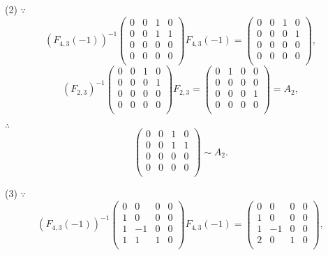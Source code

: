 \documentclass[color=black,device=normal,lang=cn,mode=geye]{elegantnote}
\begin{document}
\begin{solution}
    (2) $\because$
    \[(F_{4,3}(-1))^{-1}\begin{pmatrix}
        0 & 0 & 1 & 0 \\
        0 & 0 & 1 & 1 \\
        0 & 0 & 0 & 0 \\
        0 & 0 & 0 & 0 \\
    \end{pmatrix}F_{4,3}(-1)=\begin{pmatrix}
        0 & 0 & 1 & 0 \\
        0 & 0 & 0 & 1 \\
        0 & 0 & 0 & 0 \\
        0 & 0 & 0 & 0 \\
    \end{pmatrix},\]
    \[(F_{2,3})^{-1}\begin{pmatrix}
        0 & 0 & 1 & 0 \\
        0 & 0 & 0 & 1 \\
        0 & 0 & 0 & 0 \\
        0 & 0 & 0 & 0 \\
    \end{pmatrix}F_{2,3}=\begin{pmatrix}
        0 & 1 & 0 & 0 \\
        0 & 0 & 0 & 0 \\
        0 & 0 & 0 & 1 \\
        0 & 0 & 0 & 0 \\
    \end{pmatrix}=A_2,\]

    $\therefore$
    \[\begin{pmatrix}
        0 & 0 & 1 & 0 \\
        0 & 0 & 1 & 1 \\
        0 & 0 & 0 & 0 \\
        0 & 0 & 0 & 0 \\
    \end{pmatrix}\sim A_2.\]

    (3) $\because$
    \[(F_{4,3}(-1))^{-1}\begin{pmatrix}
        0 & 0 & 0 & 0 \\
        1 & 0 & 0 & 0 \\
        1 & -1 & 0 & 0 \\
        1 & 1 & 1 & 0 \\
    \end{pmatrix}F_{4,3}(-1)=\begin{pmatrix}
        0 & 0 & 0 & 0 \\
        1 & 0 & 0 & 0 \\
        1 & -1 & 0 & 0 \\
        2 & 0 & 1 & 0 \\
    \end{pmatrix},\]


\end{solution}
\end{document}
